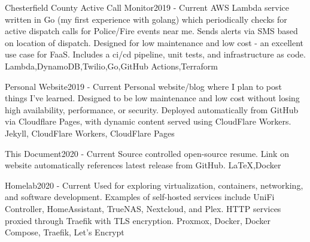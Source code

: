 \begin{projects}
    \project
    {Chesterfield County Active Call Monitor}{2019 - Current}
    {}
    {AWS Lambda service written in Go (my first experience with golang) which periodically checks for active dispatch calls for Police/Fire events near me. Sends alerts via SMS based on location of dispatch. Designed for low maintenance and low cost - an excellent use case for FaaS. Includes a ci/cd pipeline, unit tests, and infrastructure as code.}
    {Lambda,DynamoDB,Twilio,Go,GitHub Actions,Terraform}

    \project
    {Personal Website}{2019 - Current}
    {}
    {Personal website/blog where I plan to post things I've learned. Designed to be low maintenance and low cost without losing high availability, performance, or security. Deployed automatically from GitHub via Cloudflare Pages, with dynamic content served using CloudFlare Workers.}
    {Jekyll, CloudFlare Workers, CloudFlare Pages}

    \project
    {This Document}{2020 - Current}
    {}
    {Source controlled open-source resume. Link on website automatically references latest release from GitHub.}%
    {\LaTeX,Docker}

    \project
    {Homelab}{2020 - Current}
    {}
    {Used for exploring virtualization, containers, networking, and software development. Examples of self-hosted services include UniFi Controller, HomeAssistant, TrueNAS, Nextcloud, and Plex. HTTP services proxied through Traefik with TLS encryption.}
    {Proxmox, Docker, Docker Compose, Traefik, Let's Encrypt}
\end{projects}